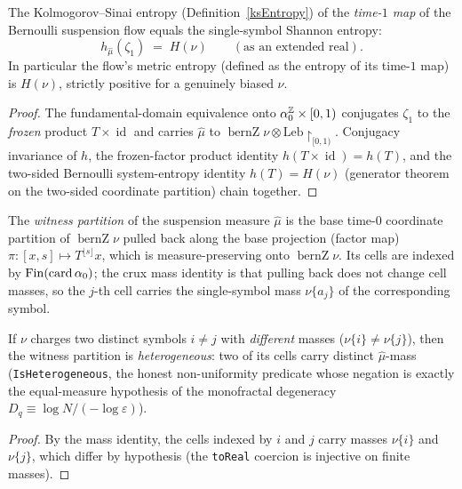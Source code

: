 \begin{theorem}\label{ksEntropy_bernSuspensionFlow_one_eq_Hnu}
  \leanok
  The Kolmogorov--Sinai entropy (Definition~\ref{ksEntropy}) of the \emph{time-\(1\) map} of the
  Bernoulli suspension flow equals the single-symbol Shannon entropy:
  \[
    h_{\hat\mu}(\zeta_1) \;=\; H(\nu) \qquad (\text{as an extended real}).
  \]
  In particular the flow's metric entropy (defined as the entropy of its time-\(1\) map) is
  \(H(\nu)\), strictly positive for a genuinely biased \(\nu\).
\end{theorem}
\begin{proof}\leanok
  The fundamental-domain equivalence onto \(\alpha_0^{\mathbb{Z}} \times [0,1)\) conjugates \(\zeta_1\)
  to the \emph{frozen} product \(T \times \operatorname{id}\) and carries \(\hat\mu\) to
  \(\operatorname{bernZ}\nu \otimes \text{Leb}\!\restriction_{[0,1)}\). Conjugacy invariance of
  \(h\), the frozen-factor product identity \(h(T \times \operatorname{id}) = h(T)\), and the
  two-sided Bernoulli system-entropy identity \(h(T) = H(\nu)\) (generator theorem on the
  two-sided coordinate partition) chain together.
\end{proof}

\begin{definition}\label{bernSuspensionWitness}
  \leanok
  The \emph{witness partition} of the suspension measure \(\hat\mu\) is the base time-\(0\)
  coordinate partition of \(\operatorname{bernZ}\nu\) pulled back along the base projection
  (factor map) \(\pi : [x,s] \mapsto T^{\lfloor s \rfloor} x\), which is measure-preserving onto
  \(\operatorname{bernZ}\nu\). Its cells are indexed by
  \(\operatorname{Fin}(\operatorname{card} \alpha_0)\); the crux mass identity is that pulling back does not change cell
  masses, so the \(j\)-th cell carries the single-symbol mass \(\nu\{a_j\}\) of the corresponding
  symbol.
\end{definition}

\begin{theorem}\label{isHeterogeneous_bernSuspensionWitness}
  \leanok
  If \(\nu\) charges two distinct symbols \(i \ne j\) with \emph{different} masses
  (\(\nu\{i\} \ne \nu\{j\}\)), then the witness partition is \emph{heterogeneous}: two of its
  cells carry distinct \(\hat\mu\)-mass (\texttt{IsHeterogeneous}, the honest non-uniformity
  predicate whose negation is exactly the equal-measure hypothesis of the monofractal degeneracy
  \(D_q \equiv \log N / (-\log\varepsilon)\)).
\end{theorem}
\begin{proof}\leanok
  By the mass identity, the cells indexed by \(i\) and \(j\) carry masses \(\nu\{i\}\) and
  \(\nu\{j\}\), which differ by hypothesis (the \texttt{toReal} coercion is injective on finite
  masses).
\end{proof}

